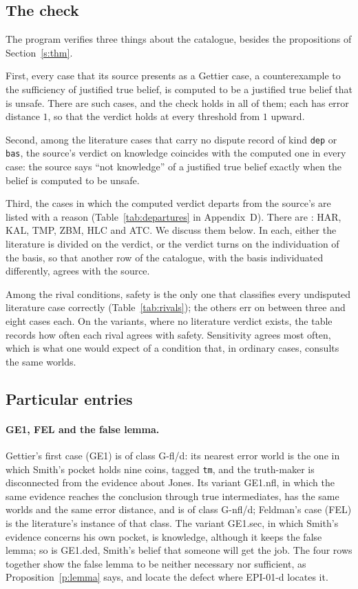 \documentclass{situationist-preprint}
\begin{document}
\subsection{The check}

The program verifies three things about the catalogue, besides the propositions of Section~\ref{s:thm}.

First, every case that its source presents as a Gettier case, a counterexample to the sufficiency of justified true belief, is computed to be a justified true belief that is unsafe. There are \stnGrows{} such cases, and the check holds in all of them; each has error distance $1$, so that the verdict holds at every threshold from $1$ upward.

Second, among the \stnundisputed{} literature cases that carry no dispute record of kind \texttt{dep} or \texttt{bas}, the source's verdict on knowledge coincides with the computed one in every case: the source says \enquote{not knowledge} of a justified true belief exactly when the belief is computed to be unsafe.

Third, the cases in which the computed verdict departs from the source's are listed with a reason (Table~\ref{tab:departures} in Appendix~D). There are \stndepart{}: HAR, KAL, TMP, ZBM, HLC and ATC. We discuss them below. In each, either the literature is divided on the verdict, or the verdict turns on the individuation of the basis, so that another row of the catalogue, with the basis individuated differently, agrees with the source.

Among the rival conditions, safety is the only one that classifies every undisputed literature case correctly (Table~\ref{tab:rivals}); the others err on between three and eight cases each. On the variants, where no literature verdict exists, the table records how often each rival agrees with safety. Sensitivity agrees most often, which is what one would expect of a condition that, in ordinary cases, consults the same worlds.

\subsection{Particular entries}

\paragraph{GE1, FEL and the false lemma.} Gettier's first case (GE1) is of class G-fl/d: its nearest error world is the one in which Smith's pocket holds nine coins, tagged \texttt{tm}, and the truth-maker is disconnected from the evidence about Jones. Its variant GE1.nfl, in which the same evidence reaches the conclusion through true intermediates, has the same worlds and the same error distance, and is of class G-nfl/d; Feldman's case (FEL) is the literature's instance of that class. The variant GE1.sec, in which Smith's evidence concerns his own pocket, is knowledge, although it keeps the false lemma; so is GE1.ded, Smith's belief that someone will get the job. The four rows together show the false lemma to be neither necessary nor sufficient, as Proposition~\ref{p:lemma} says, and locate the defect where EPI-01-d locates it.
\end{document}
